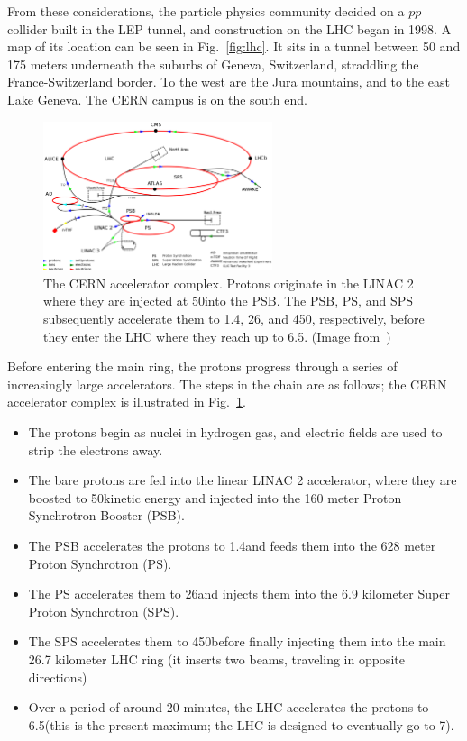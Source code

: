From these considerations, the particle physics community 
decided on a $pp$ collider built in the LEP tunnel,
and construction on the LHC began in 1998. A map of its location can be seen in
Fig.~\ref{fig:lhc}. It sits in a tunnel between 50 and 175 meters underneath
the suburbs of Geneva, Switzerland, straddling the France-Switzerland border.
To the west are the Jura mountains, and to the east Lake Geneva. The CERN
campus is on the south end.

\begin{figure}[t]
  \begin{center}
    \includegraphics[width=0.60\textwidth]{figs/cms/accelerator_complex.png}
    \caption{The CERN accelerator complex. Protons originate in the LINAC 2 where they are 
      injected at 50\MeV into the PSB. The PSB, PS, and SPS subsequently accelerate them
      to 1.4\GeV, 26\GeV, and 450\GeV, respectively, before they enter the LHC where they
      reach up to 6.5\TeV. (Image from~\cite{accelerator_complex})
            }
    \label{fig:cern_accelerator_complex}
  \end{center}
\end{figure}

Before entering the main ring, the protons progress through a series of
increasingly large accelerators. The steps in the chain are as follows;
the CERN accelerator complex is
illustrated in Fig.~\ref{fig:cern_accelerator_complex}. 
\begin{itemize}\setlength\itemsep{-1mm}
\item The protons begin as nuclei in hydrogen gas, and electric fields are used to strip the electrons away.
\item The bare protons are fed into the linear LINAC 2 accelerator, where
they are boosted to 50\MeV kinetic energy and injected into the 160 meter
Proton Synchrotron Booster (PSB).
\item The PSB accelerates the protons to 1.4\GeV and feeds them into the
628 meter Proton Synchrotron (PS).
\item The PS accelerates them to 26\GeV and injects them into the
6.9 kilometer Super Proton Synchrotron (SPS).
\item The SPS accelerates them to 450\GeV before finally injecting
them into the main 26.7 kilometer LHC ring (it inserts two beams, traveling
in opposite directions)
\item Over a period of around 20 minutes, the LHC accelerates the protons
to 6.5\TeV (this is the present maximum; the LHC is designed to eventually
go to 7\TeV).
\end{itemize}

